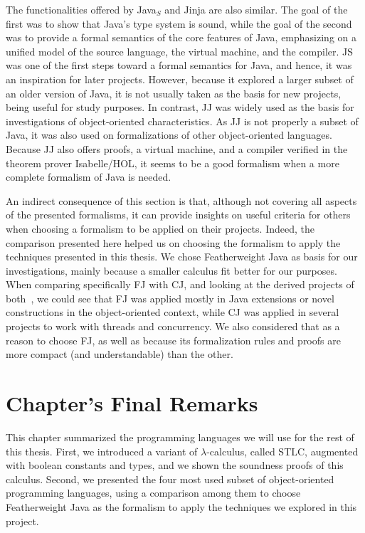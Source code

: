 \documentclass[tese,capa,english]{texufpel}
\begin{document}
The functionalities offered by Java$_S$ and Jinja are also similar. The goal of the first was to show that Java's type system is sound, while the goal of the second was to provide a formal semantics of the core features of Java, emphasizing on a unified model of the source language, the virtual machine, and the compiler. JS was one of the first steps toward a formal semantics for Java, and hence, it was an inspiration for later projects. However, because it explored a larger subset of an older version of Java, it is not usually taken as the basis for new projects, being useful for study purposes. In contrast, JJ was widely used as the basis for investigations of object-oriented characteristics. As JJ is not properly a subset of Java, it was also used on formalizations of other object-oriented languages. Because JJ also offers proofs, a virtual machine, and a compiler verified in the theorem prover Isabelle/HOL, it seems to be a good formalism when a more complete formalism of Java is needed.

An indirect consequence of this section is that, although not covering all aspects of the presented formalisms, it can provide insights on useful criteria for others when choosing a formalism to be applied on their projects. Indeed, the comparison presented here helped us on choosing the formalism to apply the techniques presented in this thesis. We chose Featherweight Java as basis for our investigations, mainly because a smaller calculus fit better for our purposes. When comparing specifically FJ with CJ, and looking at the derived projects of both~\cite{feitosa2018-1}, we could see that FJ was applied mostly in Java extensions or novel constructions in the object-oriented context, while CJ was applied in several projects to work with threads and concurrency. We also considered that as a reason to choose FJ, as well as because its formalization rules and proofs are more compact (and understandable) than the other. 

\section{Chapter's Final Remarks}

This chapter summarized the programming languages we will use for the rest of this thesis. First, we introduced a variant of $\lambda$-calculus, called STLC, augmented with boolean constants and types, and we shown the soundness proofs of this calculus. Second, we presented the four most used subset of object-oriented programming languages, using a comparison among them to choose Featherweight Java as the formalism to apply the techniques we explored in this project. 
\end{document}
